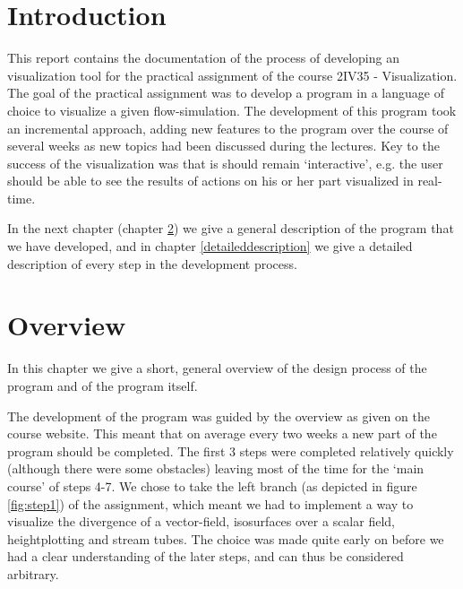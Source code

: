 \documentclass[a4paper,11pt,twoside]{report}
\begin{document}
\newcommand{\coursename}{Visualization (2IV35)}
\newcommand{\doctitle}{Practical assignment }
\newcommand{\docversion}{0.1}
\newcommand{\docdate}{\today}

\newcommand{\imagescalefactor}{0.40}
\newcommand{\cref}[1]{chapter \ref{#1}}
\newcommand{\TODO}[1]{\textsc{\textbf{TODO: #1}}}

\newcommand{\velocity}{\overrightarrow{v}}
\newcommand{\force}{\overrightarrow{F}}
\newcommand{\divv}{\textit{div}(\overrightarrow{v})}
\newcommand{\divf}{\textit{div}(\overrightarrow{F})}

\dotsspreamble

\tableofcontents

\dotssdocument

\chapter{Introduction}
	This report contains the documentation of the process of developing an visualization tool for the practical assignment of the course 2IV35 - Visualization. The goal of the practical assignment was to develop a program in a language of choice to visualize a given flow-simulation. The development of this program took an incremental approach, adding new features to the program over the course of several weeks as new topics had been discussed during the lectures. Key to the success of the visualization was that is should remain `interactive', e.g. the user should be able to see the results of actions on his or her part visualized in real-time.

	In the next chapter (\cref{overview}) we give a general description of the program that we have developed, and in \cref{detaileddescription} we give a detailed description of every step in the development process.

\chapter{Overview}\label{overview}
	In this chapter we give a short, general overview of the design process of the program and of the program itself.

	The development of the program was guided by the overview as given on the course website. This meant that on average every two weeks a new part of the program should be completed. The first 3 steps were completed relatively quickly (although there were some obstacles) leaving most of the time for the `main course' of steps 4-7. We chose to take the left branch (as depicted in figure \ref{fig:step1}) of the assignment, which meant we had to implement a way to visualize the divergence of a vector-field, isosurfaces over a scalar field, heightplotting and stream tubes. The choice was made quite early on before we had a clear understanding of the later steps, and can thus be considered arbitrary.
\end{document}
